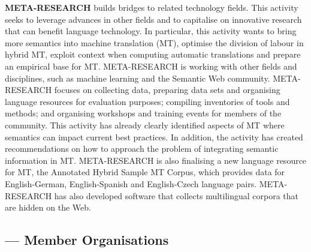 \documentclass{scrartcl}
\begin{document}
\begin{Parallel}[c]{70mm}{70mm}
{    \textbf{META-RESEARCH} builds bridges to related technology fields. This activity seeks to leverage advances in other fields and to capitalise on innovative research that can benefit language technology. In particular, this activity wants to bring more semantics into machine translation (MT), optimise the division of labour in hybrid MT, exploit context when computing automatic translations and prepare an empirical base for MT. META-RESEARCH is working with other fields and disciplines, such as machine learning and the Semantic Web community. META-RESEARCH focuses on collecting data, preparing data sets and organising language resources for evaluation purposes; compiling inventories of tools and methods; and organising workshops and training events for members of the community. This activity has already clearly identified aspects of MT where semantics can impact current best practices. In addition, the activity has created recommendations on how to approach the problem of integrating semantic information in MT. META-RESEARCH is also finalising a new language resource for MT, the Annotated Hybrid Sample MT Corpus, which provides data for English-German, English-Spanish and English-Czech language pairs. META-RESEARCH has also developed software that collects multilingual corpora that are hidden on the Web.
  }

  \ParallelPar


  \subsection{ --- Member Organisations}


  \ParallelPar


\end{Parallel}
\end{document}

